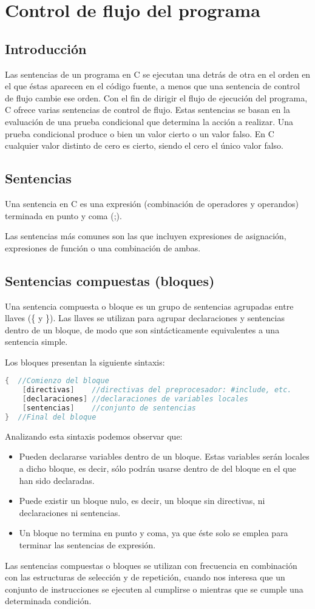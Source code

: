 \chapter{Control de flujo del programa}
\setcounter{section}{0}
\section{Introducción}
Las sentencias de un programa en C se ejecutan una detrás de otra en el orden en el que éstas aparecen en el código fuente, a menos que una sentencia de control de flujo cambie ese orden. Con el fin de dirigir el flujo de ejecución del programa, C ofrece varias sentencias de control de flujo. Estas sentencias se basan en la evaluación de una prueba condicional que determina la acción a realizar. Una prueba condicional produce o bien un valor cierto o un valor falso. En C cualquier valor distinto de cero es cierto, siendo el cero el único valor falso.
\section{Sentencias}
Una sentencia en C es una expresión (combinación de operadores y operandos) terminada en punto y coma (;).

Las sentencias más comunes son las que incluyen expresiones de asignación, expresiones de función o una combinación de ambas.
\section{Sentencias compuestas (bloques)}
Una sentencia compuesta o bloque es un grupo de sentencias agrupadas entre llaves (\{ y \}). Las llaves se utilizan para agrupar declaraciones y sentencias dentro de un bloque, de modo que son sintácticamente equivalentes a una sentencia simple.

Los bloques presentan la siguiente sintaxis:
\begin{lstlisting}[language=C]
{  //Comienzo del bloque
    [directivas]	//directivas del preprocesador: #include, etc.
    [declaraciones]	//declaraciones de variables locales
    [sentencias]	//conjunto de sentencias
}  //Final del bloque
\end{lstlisting}
Analizando esta sintaxis podemos observar que:
\begin{itemize}
	\item Pueden declararse variables dentro de un bloque. Estas variables serán locales a dicho bloque, es decir, sólo podrán usarse dentro de del bloque en el que han sido declaradas.
	\item Puede existir un bloque nulo, es decir, un bloque sin directivas, ni declaraciones ni sentencias.
	\item Un bloque no termina en punto y coma, ya que  éste solo se emplea para terminar las sentencias de expresión.
\end{itemize}
Las sentencias compuestas o bloques se utilizan con frecuencia en combinación con las estructuras de selección y de repetición, cuando nos interesa que un conjunto de instrucciones se ejecuten al cumplirse o mientras que se cumple una determinada condición.
